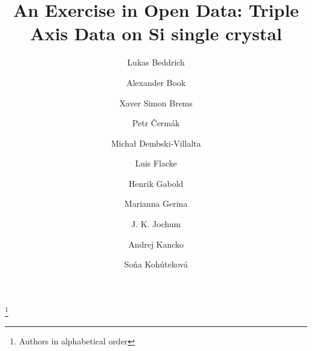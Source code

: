 \documentclass[aps,prx,reprint,amsmath,amssymb,superscriptaddress,showpacs]{revtex4-1}
\begin{document}

\title{An Exercise in Open Data: Triple Axis Data on Si single crystal}%
\thanks{Authors in alphabetical order}%

\author{Lukas Beddrich}
\address{Heinz Maier-Leibnitz Zentrum (MLZ), Technische Universit\"at M\"unchen, D-85748 Garching, Germany}
\address{Technische Universit\"at M\"unchen, Physik-Department, Lehrstuhl für Neutronenstreuung (E21), D-85748 Garching, Germany}

\author{Alexander Book}
\address{Technische Universit\"at M\"unchen, Physik-Department, Lehrstuhl für Neutronenstreuung (E21), D-85748 Garching, Germany}

\author{Xaver Simon Brems}
\address{Heinz Maier-Leibnitz Zentrum (MLZ), Technische Universit\"at M\"unchen, D-85748 Garching, Germany}

\author{Petr Čermák}
\address{Charles University, Faculty of Mathematics and Physics, Department of Condensed Matter Physics}

\author{Michał Dembski-Villalta}
\address{Technische Universit\"at M\"unchen, D-85748 Garching, Germany}

\author{Luis Flacke}
\address{Walther Meißner Institut, Bayerische Akademie der Wissenschaften, D-85748 Garching, Germany}
\address{Technische Universit\"at M\"unchen, D-85748 Garching, Germany}

\author{Henrik Gabold}
\address{Technische Universit\"at M\"unchen, Physik-Department, Lehrstuhl für Neutronenstreuung (E21), D-85748 Garching, Germany}

\author{Marianna Gerina}
\address{Charles University, Faculty of Mathematics and Physics, Department of Condensed Matter Physics}

\author{J. K. Jochum}
\address{Heinz Maier-Leibnitz Zentrum (MLZ), Technische Universit\"at M\"unchen, D-85748 Garching, Germany}

\author{Andrej Kancko}
\address{Charles University, Faculty of Mathematics and Physics, Department of Condensed Matter Physics}

\author{Soňa Kohúteková}
\address{Charles University, Faculty of Science, Department of Inorganic Chemistry, Prague}
\end{document}
